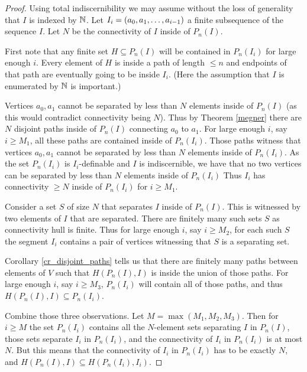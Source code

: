 \begin{proof}
  Using total indiscernibility we may assume without the loss of generality that $I$ is indexed by $\mathbb{N}$.
  Let $I_i = \left(a_0, a_1, \ldots, a_{i-1}\right)$ a finite subsequence of the sequence $I$.
  Let $N$ be the connectivity of $I$ inside of $P_n(I)$.

  First note that any finite set $H \subseteq P_n(I)$ will be contained in $P_n(I_i)$ for large enough $i$.
  Every element of $H$ is inside a path of length $\leq n$ and endpoints of that path are eventually going to be inside $I_i$.
  (Here the assumption that $I$ is enumerated by $\mathbb{N}$ is important.)

  Vertices $a_0, a_1$ cannot be separated by less than $N$ elements inside of $P_n(I)$
  (as this would contradict connectivity being $N$).
  Thus by Theorem \ref{megner} there are $N$ disjoint paths inside of $P_n(I)$ connecting $a_0$ to $a_1$.
  For large enough $i$, say $i \geq M_1$, all these paths are contained inside of $P_n(I_i)$.
  Those paths witness that vertices $a_0, a_1$ cannot be separated by less than $N$ elements inside of $P_n(I_i)$.
  As the set $P_n(I_i)$ is $I_i$-definable and $I$ is indiscernible,
  we have that no two vertices can be separated by less than $N$ elements inside of $P_n(I_i)$
  Thus $I_i$ has connectivity $\geq N$ inside of $P_n(I_i)$ for $i \geq M_1$.

  Consider a set $S$ of size $N$ that separates $I$ inside of $P_n(I)$.
  This is witnessed by two elements of $I$ that are separated.
  There are finitely many such sets $S$ as connectivity hull is finite.
  Thus for large enough $i$, say $i \geq M_2$, for each such $S$
  the segment $I_i$ contains a pair of vertices witnessing that $S$ is a separating set.

  Corollary \ref{cr_disjoint_paths} tells us that there are finitely many paths between elements of $V$ such that
  $H(P_n(I), I)$ is inside the union of those paths.
  For large enough $i$, say $i \geq M_3$, $P_n(I_i)$ will contain all of those paths, and thus $H(P_n(I), I) \subseteq P_n(I_i)$.

  Combine those three observations.
  Let $M = \max(M_1, M_2, M_3)$.
  Then for $i \geq M$ the set $P_n(I_i)$ contains all the $N$-element sets separating $I$ in $P_n(I)$,
  those sets separate $I_i$ in $P_n(I_i)$,
  and the connectivity of $I_i$ in $P_n(I_i)$ is at most $N$.
  But this means that the connectivity of $I_i$ in $P_n(I_i)$ has to be exactly $N$, and $H(P_n(I), I) \subseteq H(P_n(I_i), I_i)$.


\end{proof}
